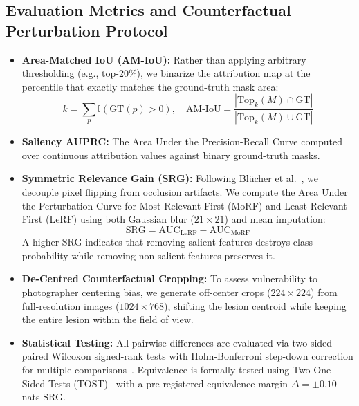 \documentclass[11pt,a4paper]{article}
\begin{document}
\subsection{Evaluation Metrics and Counterfactual Perturbation Protocol}
\begin{itemize}
    \item \textbf{Area-Matched IoU (AM-IoU):} Rather than applying arbitrary thresholding (e.g., top-20\%), we binarize the attribution map at the percentile that exactly matches the ground-truth mask area:
    \begin{equation}
    k = \sum_{p} \mathbb{I}(\text{GT}(p) > 0), \quad \text{AM-IoU} = \frac{|\text{Top}_k(M) \cap \text{GT}|}{|\text{Top}_k(M) \cup \text{GT}|}
    \end{equation}
    \item \textbf{Saliency AUPRC:} The Area Under the Precision-Recall Curve computed over continuous attribution values against binary ground-truth masks.
    \item \textbf{Symmetric Relevance Gain (SRG):} Following Bl{\"u}cher et al.~\cite{blucher2024decoupling}, we decouple pixel flipping from occlusion artifacts. We compute the Area Under the Perturbation Curve for Most Relevant First (MoRF) and Least Relevant First (LeRF) using both Gaussian blur ($21\times21$) and mean imputation:
    \begin{equation}
    \text{SRG} = \text{AUC}_{\text{LeRF}} - \text{AUC}_{\text{MoRF}}
    \end{equation}
    A higher SRG indicates that removing salient features destroys class probability while removing non-salient features preserves it.
    \item \textbf{De-Centred Counterfactual Cropping:} To assess vulnerability to photographer centering bias, we generate off-center crops ($224\times224$) from full-resolution images ($1024\times768$), shifting the lesion centroid while keeping the entire lesion within the field of view.
    \item \textbf{Statistical Testing:} All pairwise differences are evaluated via two-sided paired Wilcoxon signed-rank tests with Holm-Bonferroni step-down correction for multiple comparisons~\cite{holm1979simple}. Equivalence is formally tested using Two One-Sided Tests (TOST)~\cite{schuirmann1987comparison} with a pre-registered equivalence margin $\Delta = \pm 0.10$ nats SRG.
\end{itemize}

\end{document}
